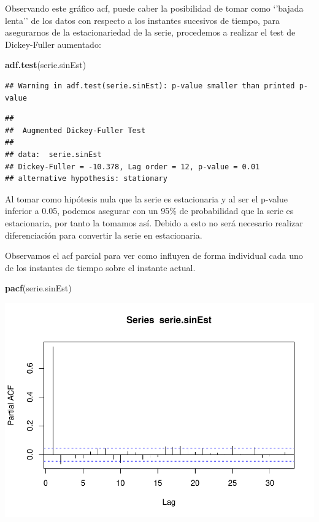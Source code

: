 \documentclass[]{article}
\newenvironment{Shaded}{\begin{snugshade}}{\end{snugshade}}
\newcommand{\KeywordTok}[1]{\textcolor[rgb]{0.13,0.29,0.53}{\textbf{#1}}}
\newcommand{\NormalTok}[1]{#1}
\begin{document}
Observando este gráfico acf, puede caber la posibilidad de tomar como
`'bajada lenta'' de los datos con respecto a los instantes sucesivos de
tiempo, para asegurarnos de la estacionariedad de la serie, procedemos a
realizar el test de Dickey-Fuller aumentado:

\begin{Shaded}
\begin{Highlighting}[]
\KeywordTok{adf.test}\NormalTok{(serie.sinEst)}
\end{Highlighting}
\end{Shaded}

\begin{verbatim}
## Warning in adf.test(serie.sinEst): p-value smaller than printed p-value
\end{verbatim}

\begin{verbatim}
## 
##  Augmented Dickey-Fuller Test
## 
## data:  serie.sinEst
## Dickey-Fuller = -10.378, Lag order = 12, p-value = 0.01
## alternative hypothesis: stationary
\end{verbatim}

Al tomar como hipótesis nula que la serie es estacionaria y al ser el
p-value inferior a 0.05, podemos asegurar con un 95\% de probabilidad
que la serie es estacionaria, por tanto la tomamos así. Debido a esto no
será necesario realizar diferenciación para convertir la serie en
estacionaria.

Observamos el acf parcial para ver como influyen de forma individual
cada uno de los instantes de tiempo sobre el instante actual.

\begin{Shaded}
\begin{Highlighting}[]
\KeywordTok{pacf}\NormalTok{(serie.sinEst)}
\end{Highlighting}
\end{Shaded}

\includegraphics{exercise2_files/figure-latex/unnamed-chunk-25-1.pdf}
\end{document}
